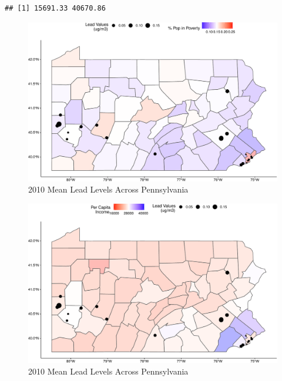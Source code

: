 \documentclass[
  12pt,
]{article}
\begin{document}
\begin{verbatim}
## [1] 15691.33 40670.86
\end{verbatim}

\begin{figure}

\includegraphics{Alcorn_Bao_Hermanson_ENV872_Project_files/figure-latex/spatial-analysis 2010-1} \hfill{}

\caption{2010 Mean Lead Levels Across Pennsylvania}\label{fig:spatial-analysis 2010}
\end{figure}

\begin{figure}

\includegraphics{Alcorn_Bao_Hermanson_ENV872_Project_files/figure-latex/spatial analysis 2010.2-1} \hfill{}

\caption{2010 Mean Lead Levels Across Pennsylvania}\label{fig:spatial analysis 2010.2}
\end{figure}
\end{document}
